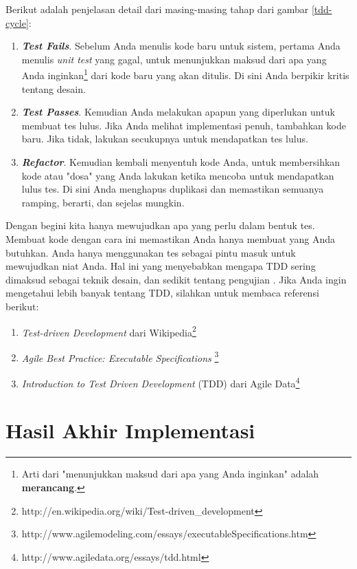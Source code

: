 \documentclass[a4paper, 12pt, oneside]{report}
\begin{document}
\onehalfspacing Berikut adalah penjelasan detail dari masing-masing tahap dari gambar \ref{tdd-cycle}:

\begin{enumerate}
  \item \textbf{\textit{Test Fails}}. Sebelum Anda menulis kode baru untuk sistem, pertama Anda menulis \textit{unit test} yang gagal, untuk menunjukkan maksud dari apa yang Anda inginkan\footnote{Arti dari "menunjukkan maksud dari apa yang Anda inginkan" adalah \textbf{merancang}.} dari kode baru yang akan ditulis. Di sini Anda berpikir kritis tentang desain.
  \item \textbf{\textit{Test Passes}}. Kemudian Anda melakukan apapun yang diperlukan untuk membuat tes lulus. Jika  Anda melihat implementasi penuh, tambahkan kode baru. Jika tidak, lakukan secukupnya untuk mendapatkan tes lulus.
  \item \textbf{\textit{Refactor}}. Kemudian kembali menyentuh kode Anda, untuk membersihkan kode atau "dosa" yang Anda lakukan ketika mencoba untuk mendapatkan lulus tes. Di sini Anda menghapus duplikasi dan memastikan semuanya ramping, berarti, dan sejelas mungkin.
\end{enumerate}

\onehalfspacing Dengan begini kita hanya mewujudkan apa yang perlu dalam bentuk tes. Membuat kode dengan cara ini memastikan Anda hanya membuat yang Anda butuhkan. Anda hanya menggunakan tes sebagai pintu masuk untuk mewujudkan niat Anda. Hal ini yang menyebabkan mengapa TDD sering dimaksud sebagai teknik desain, dan sedikit tentang pengujian \cite{agile-samurai}. Jika Anda ingin mengetahui lebih banyak tentang TDD, silahkan untuk membaca referensi berikut:

\begin{enumerate}
  \item \textit{Test-driven Development} dari Wikipedia\footnote{http://en.wikipedia.org/wiki/Test-driven\_development}
  \item \textit{Agile Best Practice: Executable Specifications} \footnote{http://www.agilemodeling.com/essays/executableSpecifications.htm}
  \item \textit{Introduction to Test Driven Development} (TDD) dari Agile Data\footnote{http://www.agiledata.org/essays/tdd.html}
\end{enumerate}

\section{Hasil Akhir Implementasi}
\end{document}
